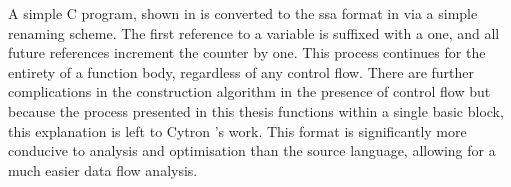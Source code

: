 \documentclass[\main/thesis.tex]{subfiles}
\begin{document}
A simple C program, shown in  is converted to the \gls{ssa} format in  via a simple renaming scheme.
The first reference to a variable is suffixed with a one, and all future references increment the counter by one.
This process continues for the entirety of a function body, regardless of any control flow.
There are further complications in the construction algorithm in the presence of control flow but because the process presented in this thesis functions within a single \gls{basic block}, this explanation is left to Cytron \etal's work.
This format is significantly more conducive to analysis and optimisation than the source language, allowing for a much easier data flow analysis.
\end{document}
